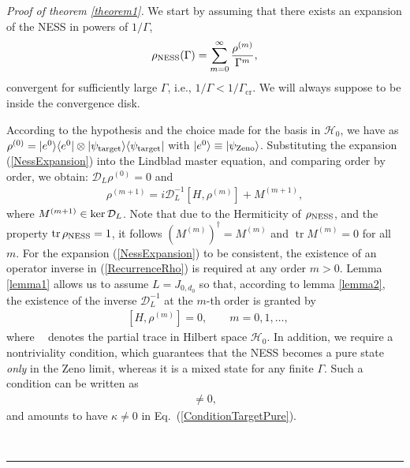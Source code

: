 \documentclass[aps,pra,letterpaper,twocolumn,showpacs,superscriptaddress,floatfix,longbibliography]{revtex4-1}
\newcommand{\tr}{\mathop{\mathrm{tr}}\limits}
\newcommand{\traccazero}{\mathop{\mathrm{tr}_{\mathcal{H}_0}}\limits}
\newtheorem{theorem}{Theorem} \newtheorem{lemma}{lemma}
\newenvironment{proof}[1][Proof]{\noindent\textit{#1.} }{\
  \rule{0.5em}{0.5em}}
\begin{document}
\begin{proof}[Proof of theorem \ref{theorem1}]
  We start by assuming that there exists an expansion of the NESS in
  powers of $1/\Gamma$,
  \begin{align}
    \rho_{\rm{NESS}}(\Gamma) = \sum_{m=0}^\infty
    \frac{\rho^{(m)}}{\Gamma^m},
    \label{NessExpansion}
  \end{align}
  convergent for sufficiently large $\Gamma$, i.e.,
  $1/\Gamma<1/\Gamma_\mathrm{cr}$. We will always suppose to be inside
  the convergence disk.

  According to the hypothesis and the choice made for the basis in
  $\mathcal{H}_0$, we have as $\rho^{(0)}=|{e^0}\rangle\langle{e^0}|\otimes
  |{\psi_{\rm{target}}}\rangle\langle{\psi_{\rm{target}}}|$ with $|{e^0}\rangle
  \equiv |{\psi_\mathrm{Zeno}}\rangle$. Substituting the expansion
  (\ref{NessExpansion}) into the Lindblad master equation, and
  comparing order by order, we obtain: $\mathcal{D}_{L} \rho^{(0)}=0$
  and
  \begin{align}
    \rho^{(m+1)} = i \mathcal{D}_L^{-1}[H,\rho^{(m)}]+ M^{(m+1)},
    \label{RecurrenceRho}
  \end{align}
  where $M^{(m+1)} \in \ker {\cal{D}}_L$. Note that due to the
  Hermiticity of $\rho_{\rm{NESS}}$, and the property
  $\tr\rho_{\rm{NESS}}=1$, it follows $\left( M^{(m)} \right)^\dagger
  = M^{(m)}$ and $\tr M^{(m)}=0$ for all $m$.  For the expansion
  (\ref{NessExpansion}) to be consistent, the existence of an operator
  inverse in (\ref{RecurrenceRho}) is required at any order $m>0$.
  Lemma \ref{lemma1} allows us to assume ${L}= J_{0,d_0}$ so that,
  according to lemma \ref{lemma2}, the existence of the inverse
  $\mathcal{D}_L^{-1}$ at the $m$-th order is granted by
  \begin{align}
    \traccazero[H,\rho^{(m)}] =0, \qquad m=0,1,\dots,
    \label{Cond1}
  \end{align}
  where $\traccazero$ denotes the partial trace in Hilbert space
  $\mathcal{H}_0$.  In addition, we require a nontriviality condition,
  which guarantees that the NESS becomes a pure state \textit{only} in
  the Zeno limit, whereas it is a mixed state for any finite
  $\Gamma$. Such a condition can be written as
  \begin{align} [H,\rho^{(0)}] \neq 0,
    \label{CondNontriviality}
  \end{align}
  and amounts to have $\kappa\neq 0$ in
  Eq.~(\ref{ConditionTargetPure}).


\end{proof}
\end{document}
